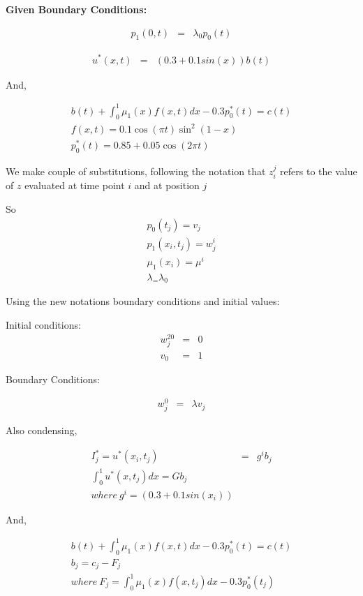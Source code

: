 \documentclass{ifacconf}
\begin{document}
\textbf{Given Boundary Conditions:}

\begin{eqnarray}
p_1(0,t) &=& \lambda_0 p_0(t)
\end{eqnarray}

\begin{eqnarray}
u^{*}(x,t) &=& (0.3+0.1 sin(x))b(t) 
\end{eqnarray}

And,

\begin{eqnarray}
b(t)+\int_0^1\mu_1(x)f(x,t)dx -0.3p_0^{*}(t) = c(t)\\
f(x,t) = 0.1\cos(\pi t)\sin^2(1-x)\\
p_0^{*}(t) = 0.85+0.05\cos(2\pi t)
\end{eqnarray}



We make couple of substitutions, following the notation that
$z_i^j$ refers to the value of $z$ evaluated at time point $i$ and at position $j$

So 
\begin{eqnarray}
p_0(t_j) = v_j \nonumber \\
p_1(x_i,t_j) = w_j^i \\
\mu_1(x_i) = \mu^i \\
\lambda_ = \lambda_0
\end{eqnarray} 


Using the new notations boundary conditions and initial values:


Initial conditions:
\begin{eqnarray}
w_j^{20} &=& 0\\
v_0 &=& 1
\end{eqnarray}

Boundary Conditions:

\begin{eqnarray}
w_j^0 &=&  \lambda v_j
\end{eqnarray}

Also condensing,


\begin{eqnarray}
	I_j^{*}=u^{*}(x_i,t_j) &=& g^ib_j \\
\int_0^1 u^{*}(x,t_j)dx = Gb_j\\
where\ g^i = (0.3+0.1sin(x_i)) \nonumber
\end{eqnarray}

And,

\begin{eqnarray}
b(t)+\int_0^1\mu_1(x)f(x,t)dx -0.3p_0^{*}(t) = c(t) \nonumber \\
b_j = c_j - F_j \\
where\ F_j = \int_0^1\mu_1(x)f(x,t_j)dx -0.3p_0^{*}(t_j)\\
\end{eqnarray}
\end{document}
